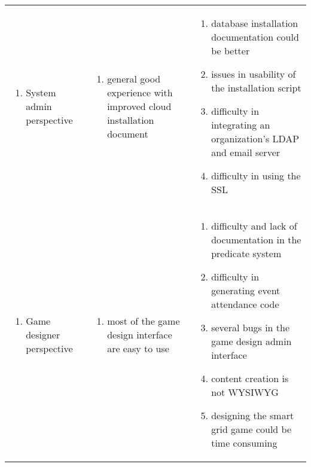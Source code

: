 \begin{table}[ht!]
  
  \begin{tabular}{|P{0.17\columnwidth}|P{0.33\columnwidth}|P{0.4\columnwidth}|}
    \hline
     &
     &
     \\
    \hline
    \begin{enumerate}[label={}, nosep, leftmargin=*]
    \item System admin perspective 
    \end{enumerate}
    & 
    \begin{enumerate}[label={}, nosep, leftmargin=*]
    \item general good experience with improved cloud installation document 
    \end{enumerate}               
    &
    \begin{enumerate}[nosep, leftmargin=*]
    \item database installation documentation could be better
    \item issues in usability of the installation script
    \item difficulty in integrating an organization's LDAP and email server
    \item difficulty in using the SSL
    \end{enumerate} \\
    \hline
    \begin{enumerate}[label={}, nosep, leftmargin=*]
    \item Game designer perspective
    \end{enumerate}
    & 
    \begin{enumerate}[label={}, nosep, leftmargin=*]
    \item most of the game design interface are easy to use 
    \end{enumerate} 
    & 
    \begin{enumerate}[nosep, leftmargin=*]
    \item difficulty and lack of documentation in the predicate system 
    \item difficulty in generating event attendance code
    \item several bugs in the game design admin interface 
    \item content creation is not WYSIWYG
    \item designing the smart grid game could be time consuming
    \end{enumerate} \\

\end{tabular}
\end{table}
